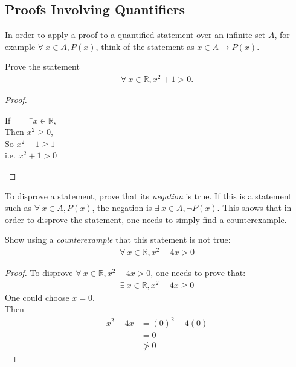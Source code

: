 \documentclass[\main/notes.tex]{subfiles}
\begin{document}
			\subsection{Proofs Involving Quantifiers}
				In order to apply a proof to a quantified statement over an infinite set $A$, for example $\forall \: x \in A, P(x)$, think of the statement as $x \in A \rightarrow P(x)$.
				\begin{example}[width=0.38\textwidth]
					Prove the statement
					\begin{align*}
						\forall \: x \in \mathbb{R}, x^{2} + 1 > 0.
					\end{align*}
					\begin{proof}
						$ $
						\begin{tabbing}
							If $\qquad$ \=$x \in \mathbb{R}$,\\
							Then \>$x^{2} \geq 0$,\\
							So \> $x^{2} + 1 \geq 1$\\
							i.e. \> $x^{2} + 1 > 0$
						\end{tabbing}
					\end{proof}
				\end{example}
				To disprove a statement, prove that its \emph{negation} is true. If this is a statement such as $\forall \: x \in A, P(x)$, the negation is $\exists \: x \in A, \lnot P(x)$. This shows that in order to disprove the statement, one needs to simply find a counterexample.
				\begin{example}[width=0.8\textwidth]
					Show using a \emph{counterexample} that this statement is not true:
					\begin{align*}
						\forall \: x \in \mathbb{R}, x^{2} - 4x > 0
					\end{align*}
					\begin{proof}
						To disprove $\forall \: x \in \mathbb{R}, x^{2} - 4x > 0$, one needs to prove that:
						\begin{align*}
							\exists \: x \in \mathbb{R}, x^{2} - 4x \geq 0
						\end{align*}
						One could choose $x = 0$.\\
						Then \begin{align*}
							x^{2} - 4x &= (0)^{2} - 4(0)\\
							&= 0\\
							& \not > 0
						\end{align*}
					\end{proof}
				\end{example}
			\pagebreak
\end{document}
